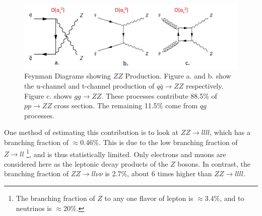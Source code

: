 \documentclass[11pt,a4paper,final]{report}
\newcommand{\ZZ}{$ZZ\to ll\nu\nu$ }
\begin{document}
\begin{figure}[H]
	\begin{center}
		\includegraphics[scale=0.5]{ZZ.png}
		\caption{Feynman Diagrams showing $ZZ$ Production. Figure a. and b. show the u-channel and t-channel production of $q\bar{q}\to ZZ$ respectively. Figure c. shows $gg\to ZZ$. These processes contribute 88.5\% of $pp\to ZZ$ cross section. The remaining 11.5\% come from $qg$ processes.}
		\label{fig:ZZdiag}
	\end{center}
\end{figure}

One method of estimating this contribution is to look at $ZZ\rightarrow llll$, which has a branching fraction of $\approx 0.46 \%$. This is due to the low branching fraction of $Z\rightarrow ll$ \footnote{The branching fraction of $Z$ to any one flavor of lepton is $\approx 3.4\%$, and to neutrinos is $\approx 20\%$.}, and is thus statistically limited. Only electrons and muons are considered here as the leptonic decay products of the $Z$ bosons. In contrast, the branching fraction of \ZZ is 2.7\%, about 6 times higher than $ZZ\rightarrow llll$.
\end{document}
